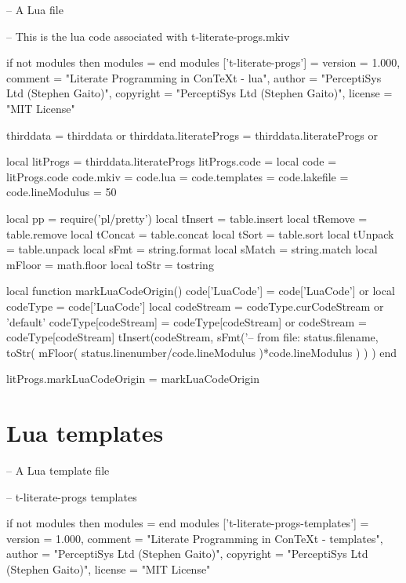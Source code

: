 \unprotect

\stopMkIVCode

\startLuaCode
-- A Lua file

-- This is the lua code associated with t-literate-progs.mkiv

if not modules then modules = { } end
modules ['t-literate-progs'] = {
    version   = 1.000,
    comment   = "Literate Programming in ConTeXt - lua",
    author    = "PerceptiSys Ltd (Stephen Gaito)",
    copyright = "PerceptiSys Ltd (Stephen Gaito)",
    license   = "MIT License"
}

thirddata               = thirddata               or {}
thirddata.literateProgs = thirddata.literateProgs or {}

local litProgs   = thirddata.literateProgs
litProgs.code    = {}
local code       = litProgs.code
code.mkiv        = {}
code.lua         = {}
code.templates   = {}
code.lakefile    = {}
code.lineModulus = 50

local pp = require('pl/pretty')
local tInsert = table.insert
local tRemove = table.remove
local tConcat = table.concat
local tSort   = table.sort
local tUnpack = table.unpack
local sFmt    = string.format
local sMatch  = string.match
local mFloor  = math.floor
local toStr   = tostring
\stopLuaCode

\startLuaCode
local function markLuaCodeOrigin()
  code['LuaCode']      = code['LuaCode'] or { }
  local codeType       = code['LuaCode']
  local codeStream     = codeType.curCodeStream or 'default'
  codeType[codeStream] = codeType[codeStream] or { }
  codeStream           = codeType[codeStream]
  tInsert(codeStream,
    sFmt('-- from file: %
      status.filename,
      toStr(
        mFloor(
          status.linenumber/code.lineModulus
        )*code.lineModulus
      )
    )
  )
end

litProgs.markLuaCodeOrigin = markLuaCodeOrigin
\stopLuaCode

\setLitProgsOriginMarker[LuaCode][markLuaCodeOrigin]

\section{Lua templates}

\startLuaTemplate
-- A Lua template file

-- t-literate-progs templates

if not modules then modules = { } end
modules ['t-literate-progs-templates'] = {
    version   = 1.000,
    comment   = "Literate Programming in ConTeXt - templates",
    author    = "PerceptiSys Ltd (Stephen Gaito)",
    copyright = "PerceptiSys Ltd (Stephen Gaito)",
    license   = "MIT License"
}

